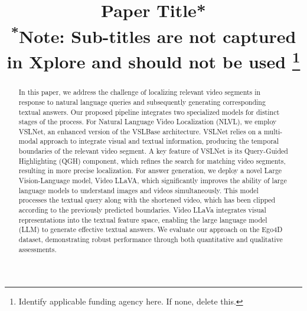 \documentclass[conference]{IEEEtran}
\begin{document}
\title{Paper Title*\\
{\footnotesize \textsuperscript{*}Note: Sub-titles are not captured in Xplore and
should not be used}
\thanks{Identify applicable funding agency here. If none, delete this.}
}

\author{
\and
{}
\and
{}
}

\maketitle

\begin{abstract}
In this paper, we address the challenge of localizing relevant video segments in response to natural language queries and subsequently generating corresponding textual answers. Our proposed pipeline integrates two specialized models for distinct stages of the process. For Natural Language Video Localization (NLVL), we employ VSLNet, an enhanced version of the VSLBase architecture. VSLNet relies on a multi-modal approach to integrate visual and textual information, producing the temporal boundaries of the relevant video segment. A key feature of VSLNet is its Query-Guided Highlighting (QGH) component, which refines the search for matching video segments, resulting in more precise localization. For answer generation, we deploy a novel Large Vision-Language model, Video LLaVA, which significantly improves the ability of large language models to understand images and videos simultaneously. This model processes the textual query along with the shortened video, which has been clipped according to the previously predicted boundaries. Video LLaVa integrates visual representations into the textual feature space, enabling the large language model (LLM) to generate effective textual answers. We evaluate our approach on the Ego4D dataset, demonstrating robust performance through both quantitative and qualitative assessments.
\end{abstract}
\end{document}
